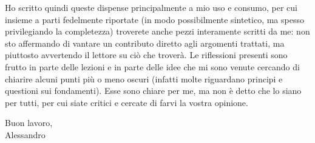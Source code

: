 Ho scritto quindi queste dispense principalmente a mio uso e consumo, per cui insieme a parti fedelmente riportate (in modo possibilmente sintetico, ma spesso privilegiando la completezza) troverete anche pezzi interamente scritti da me: non sto affermando di vantare un contributo diretto agli argomenti trattati, ma piuttosto avvertendo il lettore su ciò che troverà. Le riflessioni presenti sono frutto in parte delle lezioni e in parte delle idee che mi sono venute cercando di chiarire alcuni punti più o meno oscuri (infatti molte riguardano principi e questioni sui fondamenti). Esse sono chiare per me, ma non è detto che lo siano per tutti, per cui siate critici e cercate di farvi la vostra opinione.

\begin{flushright}
	Buon lavoro,\\
	Alessandro
\end{flushright}
